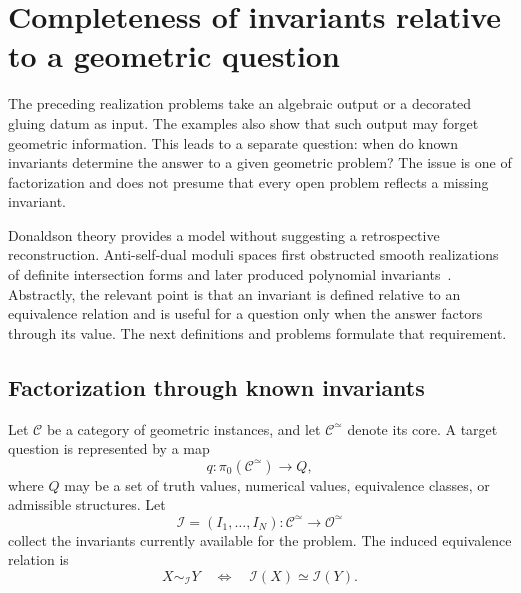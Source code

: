 \documentclass[11pt,letterpaper,twoside]{article}
\theoremstyle{plain}
\theoremstyle{definition}
\theoremstyle{remark}
\let\cite\citep
\begin{document}
\section{Completeness of invariants relative to a geometric question}\label{sec:question-driven}

The preceding realization problems take an algebraic output or a decorated gluing datum as input.  The examples also show that such output may forget geometric information.  This leads to a separate question: when do known invariants determine the answer to a given geometric problem?  The issue is one of factorization and does not presume that every open problem reflects a missing invariant.

Donaldson theory provides a model without suggesting a retrospective reconstruction.  Anti-self-dual moduli spaces first obstructed smooth realizations of definite intersection forms and later produced polynomial invariants~\cite{donaldson1983,donaldson1990}.  Abstractly, the relevant point is that an invariant is defined relative to an equivalence relation and is useful for a question only when the answer factors through its value.  The next definitions and problems formulate that requirement.

\subsection{Factorization through known invariants}

Let \(\mathcal C\) be a category of geometric instances, and let \(\mathcal C^{\simeq}\) denote its core.  A target question is represented by a map
\[
 q\colon \pi_0(\mathcal C^{\simeq})\longrightarrow Q,
\]
where \(Q\) may be a set of truth values, numerical values, equivalence classes, or admissible structures.  Let
\[
 \mathcal I=(I_1,\ldots,I_N)\colon
 \mathcal C^{\simeq}\longrightarrow \mathcal O^{\simeq}
\]
collect the invariants currently available for the problem.  The induced equivalence relation is
\[
 X\sim_{\mathcal I}Y
 \quad\Longleftrightarrow\quad
 \mathcal I(X)\simeq \mathcal I(Y).
\]
\end{document}
